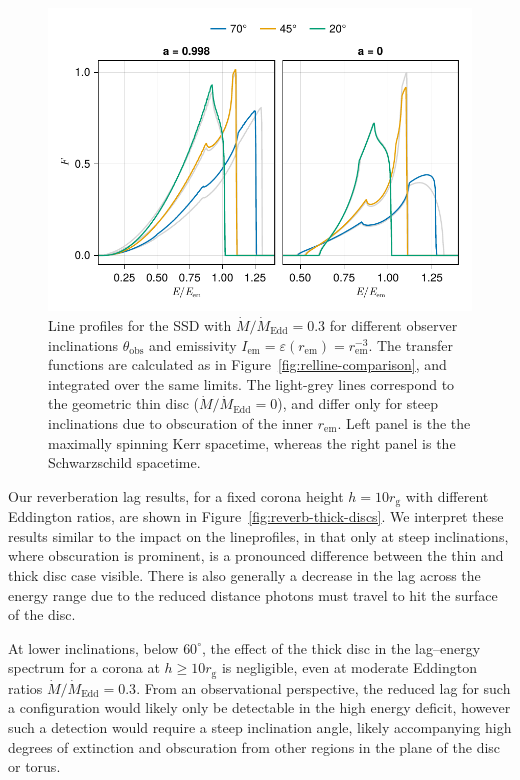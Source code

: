 \documentclass[fleqn,usenatbib]{mnras}
\newcommand{\rg}{r_\text{g}}
\newcommand{\rhoem}{r_\text{em}}
\begin{document}
\begin{figure}
    \centering
    \includegraphics[width=0.99\columnwidth]{figures/lineprofiles.ssd.pdf}
    \caption{Line profiles for the SSD with $\dot{M} / \dot{M}_\text{Edd} = 0.3$
    for different observer inclinations $\theta_\text{obs}$ and emissivity
$I_\text{em} = \varepsilon(\rhoem) = \rhoem^{-3}$. The transfer functions are
calculated as in Figure~\ref{fig:relline-comparison}, and integrated over the
same limits. The light-grey lines correspond to the geometric thin disc
($\dot{M} / \dot{M}_\text{Edd} = 0$), and differ only for steep inclinations due
to obscuration of the inner $\rhoem$. Left panel is the the maximally spinning
Kerr spacetime, whereas the right panel is the Schwarzschild spacetime.}
    \label{fig:line-profile-ssd}
\end{figure}

Our reverberation lag results, for a fixed corona height $h=10 \rg$ with
different Eddington ratios, are shown in Figure~\ref{fig:reverb-thick-discs}. We
interpret these results similar to the impact on the lineprofiles, in that only
at steep inclinations, where obscuration is prominent, is a pronounced
difference between the thin and thick disc case visible. There is also generally
a decrease in the lag across the energy range due to the reduced distance
photons must travel to hit the surface of the disc.

At lower inclinations, below $60^\circ$, the effect of the thick disc in the
lag--energy spectrum for a corona at $h \geq 10 \rg$ is negligible, even at
moderate Eddington ratios $\dot{M} / \dot{M}_\text{Edd} = 0.3$. From an
observational perspective, the reduced lag for such a configuration would likely
only be detectable in the high energy deficit, however such a detection would
require a steep inclination angle, likely accompanying high degrees of
extinction and obscuration from other regions in the plane of the disc or torus.
\end{document}
